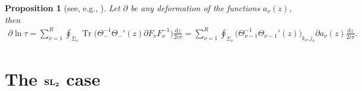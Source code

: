 \documentclass[pdftex]{sigma}
\numberwithin{equation}{section}
\newtheorem{Proposition}[Theorem]{Proposition}
 { \theoremstyle{definition}
\newtheorem{Remark}[Theorem]{Remark} }
\def \pa{\partial}
\def\d{\mathrm d}
\begin{document}
\begin{Proposition}[{see, e.g., \cite[Theorem~2.1]{BertolaCafasso1}}] \label{prop11}
Let $\pa$ be any deformation of the functions $a_\nu(z)$, then
\begin{gather*}
\pa \ln \tau = \sum_{\nu=1}^R \oint_{\Sigma_\nu} \operatorname{Tr} \big(\Theta_-^{-1} \Theta_-'(z) \pa F_\nu F_\nu^{-1} \big) \frac {\d z}{2i\pi}
 = \sum_{\nu=1}^R \oint_{\Sigma_\nu} \big(\Theta_{\nu-1}^{-1} \Theta_{\nu-1}'(z) \big)_{k_\nu, j_\nu} \pa a_\nu(z) \frac {\d z}{2i\pi}.
\end{gather*}
\end{Proposition}

\section[The ${\rm SL}_2$ case]{The $\boldsymbol{{\rm SL}_2}$ case}
\end{document}

